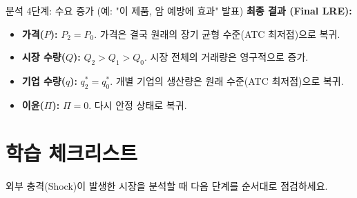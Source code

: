 \documentclass[11pt,a4paper]{book}
\theoremstyle{definition}
\begin{document}
\begin{mybox}{분석 4단계: 수요 증가 (예: "이 제품, 암 예방에 효과" 발표)}
\textbf{최종 결과 (Final LRE):}
\begin{itemize}
    \item \textbf{가격($P$):} $P_2 = P_0$. 가격은 결국 원래의 장기 균형 수준(ATC 최저점)으로 복귀.
    \item \textbf{시장 수량($Q$):} $Q_2 > Q_1 > Q_0$. 시장 전체의 거래량은 영구적으로 증가.
    \item \textbf{기업 수량($q$):} $q_2^* = q_0^*$. 개별 기업의 생산량은 원래 수준(ATC 최저점)으로 복귀.
    \item \textbf{이윤($\Pi$):} $\Pi = 0$. 다시 안정 상태로 복귀.
\end{itemize}
\end{mybox}


\section{학습 체크리스트}

외부 충격(Shock)이 발생한 시장을 분석할 때 다음 단계를 순서대로 점검하세요.
\end{document}

